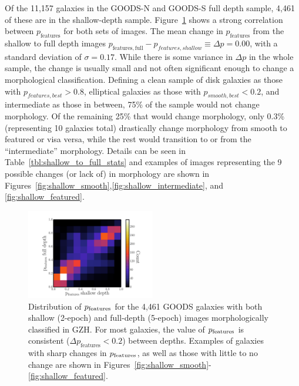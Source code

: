 \documentclass[twocolumn]{aastex6}
\begin{document}
Of the 11,157 galaxies in the GOODS-N and GOODS-S full depth sample, 4,461 of these are in the shallow-depth sample. Figure~\ref{fig:shallow_vs_full} shows a strong correlation between $p_\mathrm{features}$ for both sets of images. The mean change in $p_\mathrm{features}$ from the shallow to full depth images  $p_\mathrm{features,full} - p_{features,shallow} \equiv \Delta p = 0.00$, with a standard deviation of $\sigma = 0.17$. While there is some variance in $\Delta p$ in the whole sample, the change is usually small and not often significant enough to change a morphological classification. Defining a clean sample of disk galaxies as those with $p_{features,best}>0.8$, elliptical galaxies as those with  $p_{smooth,best}<0.2$, and intermediate as those in between, 75\% of the sample would not change morphology. Of the remaining 25\% that would change morphology, only 0.3\% (representing 10 galaxies total) drastically change morphology from smooth to featured or visa versa, while the rest would transition to or from the ``intermediate'' morphology. Details can be seen in Table~\ref{tbl:shallow_to_full_stats} and examples of images representing the 9 possible changes (or lack of) in morphology are shown in Figures~\ref{fig:shallow_smooth},\ref{fig:shallow_intermediate}, and \ref{fig:shallow_featured}.

\begin{figure}
\begin{center}
\includegraphics[width=0.50\textwidth]{figures/full_shallow_p_plot.pdf}
\caption{Distribution of $p_{\rm features}$ for the 4,461 GOODS galaxies with both shallow (2-epoch) and full-depth (5-epoch) images morphologically classified in GZH. For most galaxies, the value of $p_{\rm features}$ is consistent ($\Delta p_\mathrm{features}<0.2$) between depths. Examples of galaxies with sharp changes in $p_{\rm features}$, as well as those with little to no change are shown in Figures~\ref{fig:shallow_smooth}-\ref{fig:shallow_featured}.}
\label{fig:shallow_vs_full}
\end{center}
\end{figure}
\end{document}
